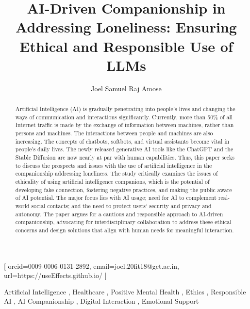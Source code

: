 

\title{AI-Driven Companionship in Addressing Loneliness: Ensuring Ethical and Responsible Use of LLMs}

\author{Joel Samuel Raj Amose}[
    orcid=0009-0006-0131-2892,
    email=joel.20fit18@gct.ac.in,
    url=https://useEffects.github.io/
]

\begin{abstract}
    Artificial Intelligence (AI) is gradually penetrating into people's lives and changing the ways of communication and interactions significantly. Currently, more than 50\% of all Internet traffic is made by the exchange of information between machines, rather than persons and machines. The interactions between people and machines are also increasing. The concepts of chatbots, softbots, and virtual assistants become vital in people's daily lives. The newly released generative AI tools like the ChatGPT and the Stable Diffusion are now nearly at par with human capabilities. Thus, this paper seeks to discuss the prospects and issues with the use of artificial intelligence in the companionship addressing loneliness. The study critically examines the issues of ethicality of using artificial intelligence companions, which is the potential of developing fake connection, fostering negative practices, and making the public aware of AI potential. The major focus lies with AI usage; need for AI to complement real-world social contacts; and the need to protect users' security and privacy and autonomy. The paper argues for a cautious and responsible approach to AI-driven companionship, advocating for interdisciplinary collaboration to address these ethical concerns and design solutions that align with human needs for meaningful interaction.
\end{abstract}

\begin{keywords}
    Artificial Intelligence \sep
    Healthcare \sep
    Positive Mental Health \sep
    Ethics \sep
    Responsible AI \sep
    AI Companionship \sep
    Digital Interaction \sep
    Emotional Support
\end{keywords}

\maketitle
